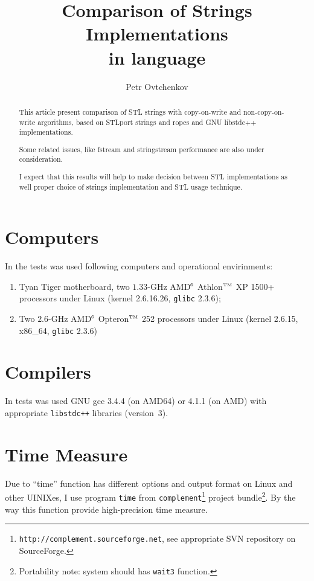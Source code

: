 \documentclass[a4paper]{article}
\title{Comparison of Strings Implementations \\ in \CPP{} language}
\author{Petr Ovtchenkov}
\providecommand{\STLport}{{\fontfamily{cmss}\selectfont STLport}}
\providecommand{\libstd}{{\fontfamily{cmtt}\selectfont GNU \mbox{libstdc++}}}
\begin{document}
\maketitle

\begin{abstract}
This article present comparison of STL strings with copy-on-write and
non-copy-on-write argorithms, based on \STLport{} strings and ropes
and \libstd{} implementations.

Some related issues, like fstream and stringstream performance
are also under consideration.

I expect that this results will help to make decision between
STL implementations as well proper choice of strings implementation
and STL usage technique.
\end{abstract}

\tableofcontents

\section{Computers}

In the tests was used following computers and operational envirinments:
\begin{enumerate}
  \item Tyan Tiger motherboard, two $1.33$-GHz
        AMD$^{\mbox{\tiny\textregistered}}$ Athlon$^{\mbox{\tiny TM}}$ XP 1500+ processors under Linux (kernel 2{.}6{.}16{.}26, \verb|glibc| 2{.}3{.}6);\label{AMD}
  \item Two $2.6$-GHz AMD$^{\mbox{\tiny\textregistered}}$ Opteron$^{\mbox{\tiny TM}}$ 252 processors under Linux (kernel 2{.}6{.}15, x86\_64, \verb|glibc| 2{.}3{.}6)\label{AMD64}
\end{enumerate}

\section{Compilers}

In tests was used GNU gcc 3{.}4{.}4 (on AMD64) or 4{.}1{.}1 (on AMD)
with appropriate
\verb|libstdc++| libraries (version~3).

\section{Time Measure\label{timemeasure}}

Due to ``time'' function has different options and output format on Linux
and other UINIXes, I use program \texttt{time} from
\texttt{complement}\footnote{\texttt{http://complement.sourceforge.net}, see appropriate SVN repository on SourceForge.}
project bundle\footnote{Portability note: system should has \texttt{wait3} function.}.
By the way this function provide high-precision time measure.
\end{document}
